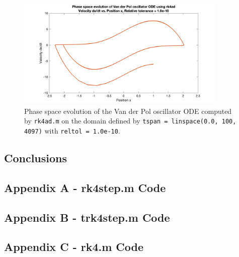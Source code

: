 \documentclass[10pt]{article}
\def\code#1{\texttt{#1}} %
\begin{document}
\begin{figure}[H]
\centering
\includegraphics[width=0.9\textwidth]{trk4ad_vdp_2.png}
\caption{Phase space evolution of the Van der Pol oscillator ODE computed by \code{rk4ad.m} on the domain
defined by \code{tspan = linspace(0.0, 100, 4097)} with \code{reltol = 1.0e-10}.}
\label{trk4ad_vdp_2_fig}
\end{figure}

\subsection*{Conclusions}


\pagebreak


\subsection*{Appendix A - rk4step.m Code}

\pagebreak

\subsection*{Appendix B - trk4step.m Code}

\pagebreak

\subsection*{Appendix C - rk4.m Code}

\pagebreak
\end{document}
